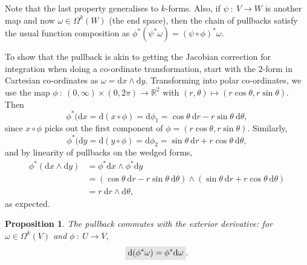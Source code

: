 \documentclass[letter-paper]{tufte-book}
\newtheorem{proposition}[theorem]{\color{pastel-blue}Proposition}
\newenvironment{example}[1][Example]{\begin{trivlist}
\item[\hskip \labelsep {\bfseries #1}]}{\end{trivlist}}
\newcommand{\highlight}[1]{\mathchoice%
  {\colorbox{black!10}{$\displaystyle#1$}}%
  {\colorbox{black!10}{$\textstyle#1$}}%
  {\colorbox{black!10}{$\scriptstyle#1$}}%
  {\colorbox{black!10}{$\scriptscriptstyle#1$}}}%
\begin{document}
Note that the last property generalises to $k$-forms. Also, if $\psi\ :\ V \to W$ is another map and now $\omega\in\Omega^k(W)$ (the end space), then the chain of pullbacks satisfy the usual function composition as $\phi^* (\psi^* \omega) = (\psi \circ \phi)^* \omega$.

\begin{example}
  To show that the pullback is akin to getting the Jacobian correction for integration when doing a co-ordinate transformation, start with the 2-form in Cartesian co-ordinates as $\omega = \mathrm{d}x \wedge \mathrm{d}y$. Transforming into polar co-ordinates, we use the map $\phi\ :\ (0,\infty) \times (0, 2\pi) \to \mathbb{R}^2$ with $(r,\theta) \mapsto (r\cos\theta, r\sin\theta)$. Then
  \begin{equation*}
    \phi^*(\mathrm{d}x = \mathrm{d}(x \circ \phi) = \mathrm{d}\phi_1 = \cos\theta\ \mathrm{d}r - r\sin\theta\ \mathrm{d}\theta,
  \end{equation*}
  since $x\circ\phi$ picks out the first component of $\phi = (r\cos\theta, r\sin\theta)$. Similarly,
  \begin{equation*}
    \phi^*(\mathrm{d}y = \mathrm{d}(y \circ \phi) = \mathrm{d}\phi_2 = \sin\theta\ \mathrm{d}r + r\cos\theta\ \mathrm{d}\theta,
  \end{equation*}
  and by linearity of pullbacks on the wedged forms,
  \begin{align*}
    \phi^* (\mathrm{d}x \wedge \mathrm{d}y)
      &= \phi^* \mathrm{d}x \wedge \phi^* \mathrm{d}y\\
      &= (\cos\theta\ \mathrm{d}r - r\sin\theta\ \mathrm{d}\theta) \wedge (\sin\theta\ \mathrm{d}r + r\cos\theta\ \mathrm{d}\theta)\\
      &= r\ \mathrm{d}r\wedge\mathrm{d}\theta,
  \end{align*}
  as expected.
\end{example}

\begin{proposition}\label{thm:commute}
  The pullback commutes with the exterior derivative: for $\omega \in \Omega^k(V)$ and $\phi\ :\ U \to V$,
  \begin{equation}
    \highlight{\mathrm{d}(\phi^*\omega) = \phi^*\mathrm{d}\omega}.
  \end{equation}
\end{proposition}
\end{document}

